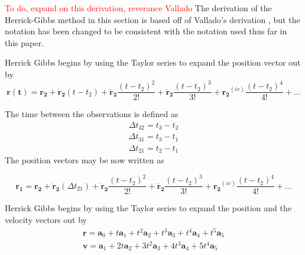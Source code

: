 \documentclass[12pt]{article}
\begin{document}
	\textcolor{red}{To do, expand on this derivation, reverance Vallado}
	\iffalse
	The derivation of the Herrick-Gibbs method in this section is based off of Vallado's derivation \cite{vallado2007fundamentals}, but the notation has been changed to be consistent with the notation used thus far in this paper. 
	
		Herrick Gibbs begins by using the Taylor series to expand the position vector out by 
		\begin{equation}
		\mathbf{r(t)}=\mathbf{r_2}+\mathbf{\dot{r}_2} (t-t_2) + \mathbf{\ddot{r}_2} \frac{(t-t_2)^2}{2!}+ \mathbf{\dddot{r}_2} \frac{(t-t_2)^3}{3!}+ \mathbf{{r_2}}^{(iv)} \frac{(t-t_2)^4}{4!}+\dots
		\end{equation}
		
		The time between the observations is defined as 
		\begin{equation}
		\begin{array} { l } { \Delta t _ { 32 } = t _ { 3 } - t _ { 2 } } \\ { \Delta t _ { 31 } = t _ { 3 } - t _ { 1 } } \\ { \Delta t _ { 21 } = t _ { 2 } - t _ { 1 } } \end{array}
		\end{equation}
		The position vectors may be now written as 
		
		\begin{equation}
		\mathbf{r_1}=\mathbf{r_2}+\mathbf{\dot{r}_2} (\Delta t _ { 21 } ) + \mathbf{\ddot{r}_2} \frac{(t-t_2)^2}{2!}+ \mathbf{\dddot{r}_2} \frac{(t-t_2)^3}{3!}+ \mathbf{{r_2}}^{(iv)} \frac{(t-t_2)^4}{4!}+\dots
		\end{equation}

	
	
	Herrick Gibbs begins by using the Taylor series to expand the position and the velocity vectors out by 
	\begin{equation}
	\begin{array} { l } { \mathbf { r } = \mathbf { a } _ { 0 } + t \mathbf { a } _ { 1 } + t ^ { 2 } \mathbf { a } _ { 2 } + t ^ { 3 } \mathbf { a } _ { 3 } + t ^ { 4 } \mathbf { a } _ { 4 } + t ^ { 5 } \mathbf { a } _ { 5 } } \\ { \mathbf { v } = \mathbf { a } _ { 1 } + 2 t \mathbf { a } _ { 2 } + 3 t ^ { 2 } \mathbf { a } _ { 3 } + 4 t ^ { 3 } \mathbf { a } _ { 4 } + 5 t ^ { 4 } \mathbf { a } _ { 5 } } \end{array}
	\end{equation}
	
	
	
\end{document}
